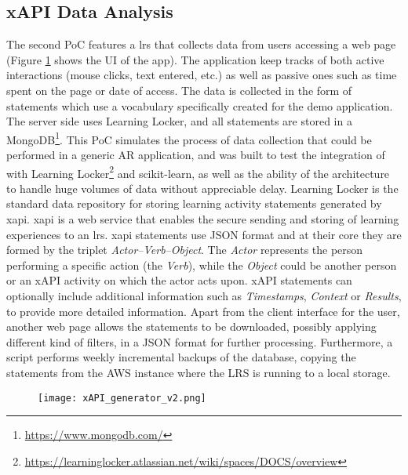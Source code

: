 \subsection{xAPI Data Analysis}
The second PoC features a \gls{lrs} that collects data from users accessing a web page (Figure \ref{fig:xapi_generator} shows the UI of the app). The application keep tracks of both active interactions (mouse clicks, text entered, etc.) as well as passive ones such as time spent on the page or date of access. The data is collected in the form of statements which use a vocabulary specifically created for the demo application. The server side uses Learning Locker, and all statements are stored in a MongoDB\footnote{\url{https://www.mongodb.com/}}. This PoC simulates the process of data collection that could be performed in a generic AR application, and was built to test the integration of \arch{} with Learning Locker\footnote{\url{https://learninglocker.atlassian.net/wiki/spaces/DOCS/overview}} and scikit-learn, as well as the ability of the architecture to handle huge volumes of data without appreciable delay. Learning Locker is the standard data repository for storing learning activity statements generated by \gls{xapi}.
\gls{xapi} is a web service that enables the secure sending and storing of learning experiences to an \gls{lrs}.
\gls{xapi} statements use JSON format and at their core they are formed by the triplet \textit{Actor--Verb--Object}.
The \textit{Actor} represents the person performing a specific action (the \textit{Verb}), while the \textit{Object} could be another person or an xAPI activity on which the actor acts upon.
xAPI statements can optionally include additional information such as \textit{Timestamps}, \textit{Context} or \textit{Results}, to provide more detailed information. Apart from the client interface for the user, another web page allows the statements to be downloaded, possibly applying different kind of filters, in a JSON format for further processing. Furthermore, a script performs weekly incremental backups of the database, copying the statements from the AWS instance where the LRS is running to a local storage.

\begin{figure}[ht!]
    \begin{center}
    \texttt{[image: xAPI\_generator\_v2.png]}
    \caption{\fontsize{10pt}{11pt}}
    \label{fig:xapi_generator}
    \end{center}
\end{figure}

